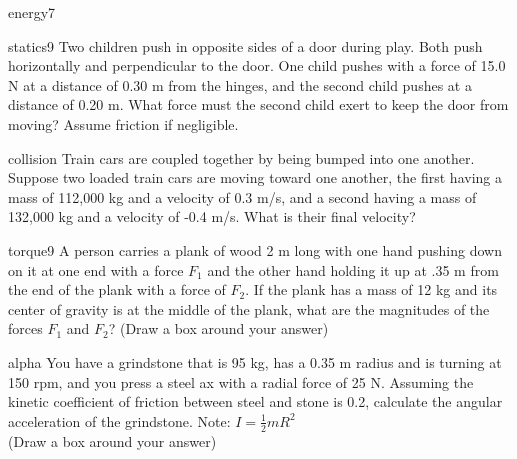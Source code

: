 \documentclass[letterpaper]{article}
\begin{document}
{\begin{question}{energy7}
\begin{question}{statics9}
  Two children push in opposite sides of a door during play. Both push
  horizontally and perpendicular to the door. One child pushes with a
  force of 15.0 N at a distance of 0.30 m from the hinges, and the
  second child pushes at a distance of 0.20 m.  What force must the
  second child exert to keep the door from moving? Assume friction if
  negligible.
\begin{choices}
\end{choices}
\end{question}

\begin{question}{collision}
  Train cars are coupled together by being bumped into one
  another. Suppose two loaded train cars are moving toward one
  another, the first having a mass of 112,000 kg and a velocity of 0.3
  m/s, and a second having a mass of 132,000 kg and a velocity of -0.4
  m/s. What is their final velocity?
\begin{choices}
\end{choices}
\end{question}

\begin{question}{torque9}
  A person carries a plank of wood 2 m long with one hand pushing down
  on it at one end with a force $F_1$ and the other hand holding it up
  at .35 m from the end of the plank with a force of $F_2$. If the
  plank has a mass of 12 kg and its center of gravity is at the
  middle of the plank, what are the magnitudes of the forces $F_1$ and
  $F_2$?  (Draw a box around your answer)
\end{question}

\begin{question}{alpha }
  You have a grindstone that is 95 kg, has a 0.35 m radius and is
  turning at 150 rpm, and you press a steel ax with a radial force of
  25 N.  Assuming the kinetic coefficient of friction between steel
  and stone is 0.2, calculate the angular acceleration of the
  grindstone. Note: $I=\frac{1}{2}mR^2$ \\ (Draw a box around your answer)
\end{question}


\end{question}}
\end{document}
